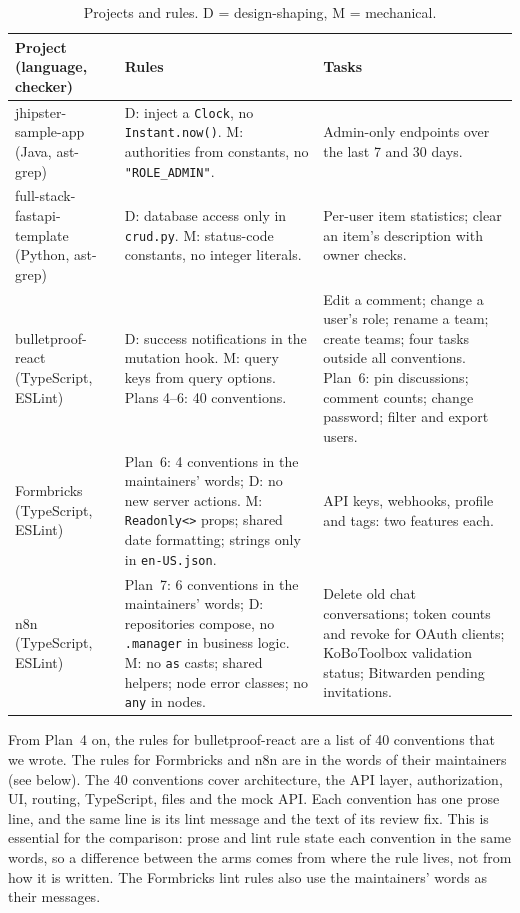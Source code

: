 \documentclass[pdflatex,sn-basic]{sn-jnl}
\newcommand{\file}[1]{\texttt{#1}}
\begin{document}
\begin{table}[!htb]
\centering
\small
\caption{Projects and rules. D = design-shaping, M = mechanical.}
\label{tab:projects}
\begin{tabularx}{\linewidth}{@{}lLL@{}}
\toprule
Project (language, checker) & Rules & Tasks \\
\midrule
jhipster-sample-app (Java, ast-grep) & D: inject a \texttt{Clock}, no \texttt{Instant.now()}. M: authorities from constants, no \texttt{"ROLE\_ADMIN"}. & Admin-only endpoints over the last 7 and 30 days. \\
full-stack-fastapi-template (Python, ast-grep) & D: database access only in \file{crud.py}. M: status-code constants, no integer literals. & Per-user item statistics; clear an item's description with owner checks. \\
bulletproof-react (TypeScript, ESLint) & D: success notifications in the mutation hook. M: query keys from query options. Plans 4--6: 40 conventions. & Edit a comment; change a user's role; rename a team; create teams; four tasks outside all conventions. Plan~6: pin discussions; comment counts; change password; filter and export users. \\
Formbricks (TypeScript, ESLint) & Plan~6: 4 conventions in the maintainers' words; D: no new server actions. M: \texttt{Readonly<>} props; shared date formatting; strings only in \texttt{en-US.json}. & API keys, webhooks, profile and tags: two features each. \\
n8n (TypeScript, ESLint) & Plan~7: 6 conventions in the maintainers' words; D: repositories compose, no \texttt{.manager} in business logic. M: no \texttt{as} casts; shared helpers; node error classes; no \texttt{any} in nodes. & Delete old chat conversations; token counts and revoke for OAuth clients; KoBoToolbox validation status; Bitwarden pending invitations. \\
\bottomrule
\end{tabularx}
\end{table}


From Plan~4 on, the rules for bulletproof-react are a list of 40 conventions that we wrote.
The rules for Formbricks and n8n are in the words of their maintainers (see below).
The 40 conventions cover architecture, the API layer, authorization, UI, routing, TypeScript, files and the mock API.
Each convention has one prose line, and the same line is its lint message and the text of its review fix.
This is essential for the comparison: prose and lint rule state each convention in the same words, so a difference between the arms comes from where the rule lives, not from how it is written.
The Formbricks lint rules also use the maintainers' words as their messages.
\end{document}

